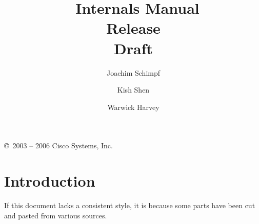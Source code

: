 %
% 
% 
% 
% 





\makeindex



\title{{\Huge \eclipse\ Internals Manual}\\
	\vspace{1cm}
	Release \eclipseversion\\
	Draft
    }
\author{
Joachim Schimpf
\and Kish Shen
\and Warwick Harvey
}

\maketitle

\setcounter{page}{2}
\pagestyle{empty}

\vfill

\copyright\ 2003 -- 2006 Cisco Systems, Inc.

\bigskip\bigskip\bigskip\bigskip\bigskip\bigskip

\cleardoublepage
\pagestyle{plain}

\begin{latexonly}
\tableofcontents
\end{latexonly}

\cleardoublepage
{}

\chapter{Introduction}
If this document lacks a consistent style, it is because some parts
have been cut and pasted from various sources.








\newpage

\newpage



